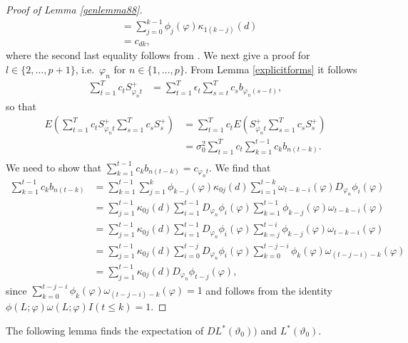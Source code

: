 {{\begin{proof}[Proof of Lemma \ref{genlemma88}]
\begin{align*}
     &= \sum_{j = 0}^{k-1} \phi_j(\varphi)  \kappa_{1(k-j)}(d) \\    
    &=  c_{d k},
\end{align*}
where the second last equality follows from \textcite[Lemma A.4]{johansen2016role}. We next give a proof for $l \in \{2,\ldots,p+1 \}$, i.e.\ $\varphi_{n}$ for $n \in \{1,\ldots,p \}$. From Lemma \ref{explicitforms} it follows
\begin{align*}
   \sum_{t = 1}^T c_{t} S_{\varphi_n t}^+  &=  \sum_{t = 1}^{T} \epsilon_t \sum_{s = t}^{T} c_{s} b_{\varphi_n(s-t)},  
\end{align*}
so that
\begin{align*}
E(  \sum_{t = 1}^T c_{t} S_{\varphi_n t}^+\sum_{s = 1}^T  c_{s} S_{s}^+  ) &=    \sum_{t = 1}^T  c_{t} E( S_{\varphi_n t}^+\sum_{s = 1}^T c_{s} S_{s}^+ )  \\
&=  \sigma^2_0 \sum_{t = 1}^{T} c_{t} \sum_{k = 1}^{t-1} c_k b_{n(t-k)}.   \\
\end{align*}
We need to show that $\sum_{k = 1}^{t-1} c_k b_{n(t-k)} = c_{\varphi_{n} t} $. We find that 
\begin{align*}
    \sum_{k = 1}^{t-1} c_k b_{n(t-k)}  &= \sum_{k = 1}^{t-1} \sum_{j = 1}^{k} \phi_{k-j}(\varphi) \kappa_{0j}(d) \sum_{i = 1}^{t-k} \omega_{t-k-i}(\varphi) D_{\varphi_{n}} \phi_{i}(\varphi) \\
    &=  \sum_{j = 1}^{t-1}  \kappa_{0j}(d) \sum_{i = 1}^{t-1}  D_{\varphi_{n}} \phi_{i}(\varphi) \sum_{k = 1}^{t-1}  \phi_{k-j}(\varphi)  \omega_{t-k-i}(\varphi)\\ 
     &=  \sum_{j = 1}^{t-1}  \kappa_{0j}(d) \sum_{i = 1}^{t-1}  D_{\varphi_{n}} \phi_{i}(\varphi) \sum_{k = j}^{t-i}  \phi_{k-j}(\varphi)  \omega_{t-k-i}(\varphi)\\ 
      &=  \sum_{j = 1}^{t-1}  \kappa_{0j}(d) \sum_{i = 0}^{t-j}  D_{\varphi_{n}} \phi_{i}(\varphi) \sum_{k = 0}^{t-j-i}  \phi_{k}(\varphi)  \omega_{(t-j-i)-k}(\varphi)\\ 
      &= \sum_{j = 1}^{t-1}  \kappa_{0j}(d)  D_{\varphi_{n}} \phi_{t-j}(\varphi),
\end{align*}
since $\sum_{k = 0}^{t-j-i}  \phi_{k}(\varphi)  \omega_{(t-j-i)-k}(\varphi) = 1$ and follows from the identity $\phi(L;\varphi)  \omega(L;\varphi) I(t \leq k) = 1$.


\end{proof}


The following lemma finds the expectation of $D L^*(\vartheta_0) )$  and $L^*(\vartheta_0)$. 


}}
